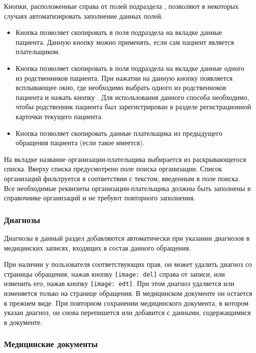 Кнопки, расположенные справа от полей подраздела , позволяют в некоторых случаях автоматизировать заполнение данных полей. 
\begin{itemize}
	\item Кнопка  позволяет скопировать в поля подраздела  на вкладке  данные пациента. Данную кнопку можно применять, если сам пациент является плательщиком.
	\item Кнопка  позволяет скопировать в поля подраздела  на вкладке  данные одного из родственников пациента. При нажатии на данную кнопку появляется всплывающее окно, где необходимо выбрать одного из родственноков пациента и нажать кнопку . Для использования данного способа необходимо, чтобы родственник пациента был зарегистрирован в разделе  регистрационной карточки текущего пациента.
	\item Кнопка  позволяет скопировать данные плательщика из предыдущего обращения пациента (если такое имеется).
\end{itemize} 

На вкладке  название организации-плательщика выбирается из раскрывающегося списка. Вверху списка предусмотрено поле поиска организации. Список организаций фильтруется в соответствии с текстом, введенным в поле поиска. Все необходимые реквизиты организации-плательщика должны быть заполнены в справочнике организаций и не требуют повторного заполнения.

\subsubsection{Диагнозы}

Диагнозы в данный раздел добавляются автоматически при указании диагнозов в медицинских записях, входящих в состав данного обращения.

При наличии у пользователя соответствующих прав, он может удалить диагноз со страницы обращения, нажав кнопку \texttt{[image: del]} справа от записи, или изменить его, нажав кнопку \texttt{[image: edt]}. При этом диагноз удаляется или изменяется только на странице обращения. В медицинском документе он остается в прежнем виде. При повторном сохранении медицинского документа, в котором указан диагноз, он снова перепишется или добавится с данными, содержащимися в документе.

\subsubsection{Медицинские документы} \label{ev_obr_md}

